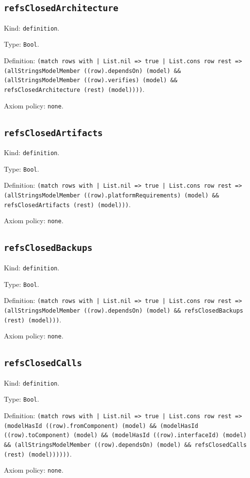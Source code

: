 \documentclass[11pt]{article}
\begin{document}
\subsection*{\texttt{refsClosedArchitecture}}
\noindent Kind: \texttt{definition}.\par
\noindent Type: \texttt{Bool}.\par
\noindent Definition: \texttt{(match rows with | List.nil => true | List.cons row rest => (allStringsModelMember ((row).dependsOn) (model) \&\& (allStringsModelMember ((row).verifies) (model) \&\& refsClosedArchitecture (rest) (model))))}.\par
\noindent Axiom policy: \texttt{none}.\par
\subsection*{\texttt{refsClosedArtifacts}}
\noindent Kind: \texttt{definition}.\par
\noindent Type: \texttt{Bool}.\par
\noindent Definition: \texttt{(match rows with | List.nil => true | List.cons row rest => (allStringsModelMember ((row).platformRequirements) (model) \&\& refsClosedArtifacts (rest) (model)))}.\par
\noindent Axiom policy: \texttt{none}.\par
\subsection*{\texttt{refsClosedBackups}}
\noindent Kind: \texttt{definition}.\par
\noindent Type: \texttt{Bool}.\par
\noindent Definition: \texttt{(match rows with | List.nil => true | List.cons row rest => (allStringsModelMember ((row).dependsOn) (model) \&\& refsClosedBackups (rest) (model)))}.\par
\noindent Axiom policy: \texttt{none}.\par
\subsection*{\texttt{refsClosedCalls}}
\noindent Kind: \texttt{definition}.\par
\noindent Type: \texttt{Bool}.\par
\noindent Definition: \texttt{(match rows with | List.nil => true | List.cons row rest => (modelHasId ((row).fromComponent) (model) \&\& (modelHasId ((row).toComponent) (model) \&\& (modelHasId ((row).interfaceId) (model) \&\& (allStringsModelMember ((row).dependsOn) (model) \&\& refsClosedCalls (rest) (model))))))}.\par
\noindent Axiom policy: \texttt{none}.\par
\end{document}
